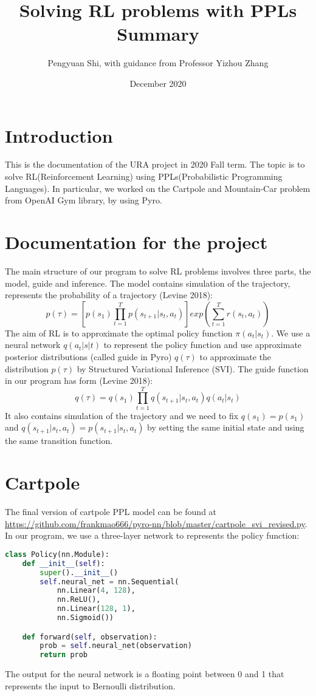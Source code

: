 \documentclass[acmsmall,nonacm=true]{acmart}
\title{Solving RL problems with PPLs Summary}
\author{Pengyuan Shi, with guidance from Professor Yizhou Zhang}
\date{December 2020}
\begin{document}
\maketitle

\section{Introduction}
This is the documentation of the URA project in 2020 Fall term. The topic is to solve RL(Reinforcement Learning) using PPLs(Probabilistic Programming Languages). In particular, we worked on the Cartpole and Mountain-Car problem from OpenAI Gym library, by using Pyro. 

\section{Documentation for the project}
The main structure of our program to solve RL problems involves three parts, the model, guide and inference. The model contains simulation of the trajectory, represents the probability of a trajectory (Levine 2018): 
\[ p(\tau) = \left[ p(s_1)\prod_{t=1}^T p(s_{t+1} | s_t, a_t) \right] exp \left(  \sum_{t=1}^T r(s_t, a_t) \right) \]
The aim of RL is to approximate the optimal policy function $\pi(a_t|s_t)$. We use a neural network $q(a_t|s|t)$ to represent the policy function and use approximate posterior distributions (called guide in Pyro) $q(\tau)$ to approximate the distribution  $p(\tau)$ by Structured Variational Inference (SVI). The guide function in our program has form (Levine 2018):
\[ q(\tau) = q(s_1)\prod_{t=1}^T q(s_{t+1} | s_t, a_t) q(a_t|s_t) \]
It also contains simulation of the trajectory and we need to fix $q(s_1) = p(s_1)$ and $q(s_{t+1} | s_t, a_t) = p (s_{t+1}|s_t,a_t)$ by setting the same initial state and using the same transition function.

\section{Cartpole}
The final version of cartpole PPL model can be found at \url{https://github.com/frankmao666/pyro-nn/blob/master/cartpole_svi_revised.py}.
In our program, we use a three-layer network to represents the policy function:

\begin{lstlisting}[language=Python]
class Policy(nn.Module):
    def __init__(self):
        super().__init__()
        self.neural_net = nn.Sequential(
            nn.Linear(4, 128),
            nn.ReLU(),
            nn.Linear(128, 1),
            nn.Sigmoid())

    def forward(self, observation):
        prob = self.neural_net(observation)
        return prob
\end{lstlisting}
The output for the neural network is a floating point between 0 and 1 that represents the input to Bernoulli distribution. 
\end{document}
